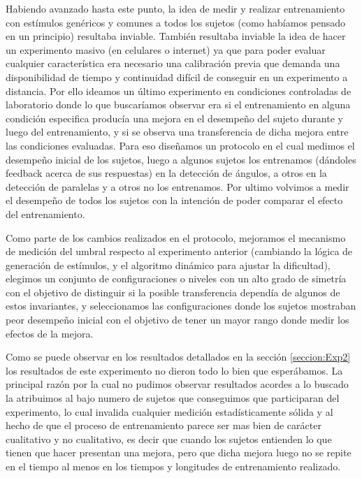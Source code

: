 \documentclass{article}
\begin{document}
    Habiendo avanzado hasta este punto, la idea de medir y realizar entrenamiento con estímulos genéricos y comunes a todos los sujetos (como habíamos pensado en un principio) resultaba inviable. También resultaba inviable la idea de hacer un experimento masivo (en celulares o internet) ya que para poder evaluar cualquier característica era necesario una calibración previa que demanda una disponibilidad de tiempo y continuidad difícil de conseguir en un experimento a distancia. Por ello ideamos un último experimento en condiciones controladas de laboratorio donde lo que buscaríamos observar era si el entrenamiento en alguna condición especifica producía una mejora en el desempeño del sujeto durante y luego del entrenamiento, y si se observa una transferencia de dicha mejora entre las condiciones evaluadas. Para eso diseñamos un protocolo en el cual medimos el desempeño inicial de los sujetos, luego a algunos sujetos los entrenamos (dándoles feedback acerca de sus respuestas) en la detección de ángulos, a otros en la detección de paralelas y a otros no los entrenamos. Por ultimo volvimos a medir el desempeño de todos los sujetos con la intención de poder comparar el efecto del entrenamiento. 
    
    Como parte de los cambios realizados en el protocolo, mejoramos el mecanismo de medición del umbral respecto al experimento anterior (cambiando la lógica de generación de estímulos, y el algoritmo dinámico para ajustar la dificultad), elegimos un conjunto de configuraciones o niveles con un alto grado de simetría con el objetivo de distinguir si la posible transferencia dependía de algunos de estos invariantes, y seleccionamos las configuraciones donde los sujetos mostraban peor desempeño inicial con el objetivo de tener un mayor rango donde medir los efectos de la mejora. 
    
    Como se puede observar en los resultados detallados en la sección \ref{seccion:Exp2} los resultados de este experimento no dieron todo lo bien que esperábamos. La principal razón por la cual no pudimos observar resultados acordes a lo buscado la atribuimos al bajo numero de sujetos que conseguimos que participaran del experimento, lo cual invalida cualquier medición estadísticamente sólida y al hecho de que el proceso de entrenamiento parece ser mas bien de carácter cualitativo y no cualitativo, es decir que cuando los sujetos entienden lo que tienen que hacer presentan una mejora, pero que dicha mejora luego no se repite en el tiempo al menos en los tiempos y longitudes de entrenamiento realizado. 
    
\end{document}
